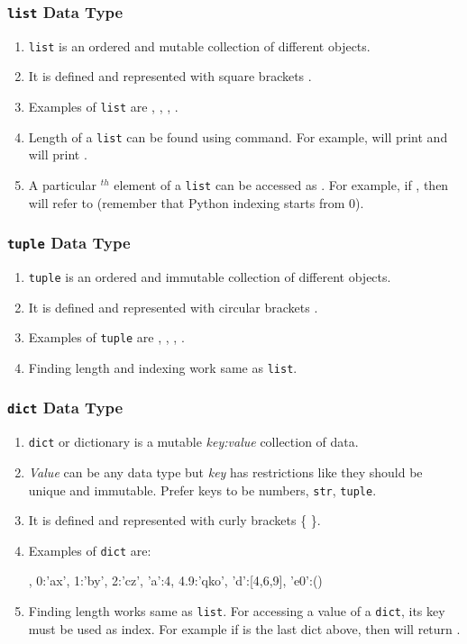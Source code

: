 \documentclass{beamer}
\begin{document}
\begin{frame}[fragile]
\frametitle{\lstinline{list} Data Type}
\begin{enumerate}
\item \lstinline{list} is an ordered and mutable collection of different objects.
\item It is defined and represented with square brackets \pyth{[...]}.
\item Examples of \lstinline{list} are \pyth{[]}, \pyth{[71, -99, 71, 4]}, \pyth{[3, 3.0, 'three']}, \pyth{[3, ['Alpha', -1], True]}.
\item Length of a \lstinline{list} can be found using  command. For example,  will print  and  will print .
\item A particular $^{th}$ element of a \lstinline{list}  can be accessed as . For example, if , then  will refer to  (remember that Python indexing starts from $0$).
\end{enumerate}
\end{frame}

\begin{frame}[fragile]
\frametitle{\lstinline{tuple} Data Type}
\begin{enumerate}
\item \lstinline{tuple} is an ordered and immutable collection of different objects.
\item It is defined and represented with circular brackets .
\item Examples of \lstinline{tuple} are \pyth{()}, , , .
\item Finding length and indexing work same as \lstinline{list}.
\end{enumerate}
\end{frame}

\begin{frame}[fragile]
\frametitle{\lstinline{dict} Data Type}
\begin{enumerate}
\item \lstinline{dict} or dictionary is a mutable \emph{key:value} collection of data.
\item \emph{Value} can be any data type but \emph{key} has restrictions like they should be unique and immutable. Prefer keys to be numbers, \lstinline{str}, \lstinline{tuple}.
\item It is defined and represented with curly brackets \{ \}.
\item Examples of \lstinline{dict} are:
\begin{python}
{}, {0:'ax', 1:'by', 2:'cz'},
{'a':4, 4.9:'qko', 'd':[4,6,9], 'e0':()}
\end{python}
\item Finding length works same as \lstinline{list}. For accessing a value of a \lstinline{dict}, its key must be used as index. For example if  is the last dict above, then  will return .
\end{enumerate}
\end{frame}
\end{document}
